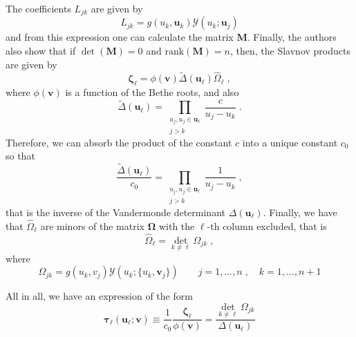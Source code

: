 \documentclass[a4paper,11pt]{amsart}
\begin{document}
The coefficients \(L_{jk}\) are given by 
\begin{equation}
  L_{jk} = g(u_k, \bm{u}_k) \mathcal{Y}(u_k; \bm{u}_j)
\end{equation}
and from this expression one can calculate the matrix \(\bm{M}\).
Finally, the authors also show that if \(\det (\bm{M}) = 0 \) and
\(\mathrm{rank}(\bm{M}) = n\), then, the Slavnov products are given by
\begin{equation}
 \bm{\zeta}_\ell = \phi(\bm{v}) \tilde{\Delta}(\bm{u}_\ell)\hat{\Omega}_\ell\; ,
\end{equation}
where \(\phi(\bm{v})\) is a function of the Bethe roots, and also
\begin{equation}
  \tilde{\Delta}(\bm{u}_\ell) = \prod_{\substack{u_j, u_j \in \bm{u}_\ell \\ j>k}} \frac{c}{u_j - u_k}\; . 
\end{equation}
Therefore, we can absorb the product of the constant \(c\) into
a unique constant \(c_0\) so that 
\begin{equation}
  \frac{\tilde{\Delta}(\bm{u}_\ell)}{c_0} = \prod_{\substack{u_j, u_j \in \bm{u}_\ell \\ j>k}} \frac{1}{u_j - u_k}\; , 
\end{equation}
that is the inverse of the Vandermonde determinant
\(\Delta(\bm{u}_\ell)\).
Finally, we have  that \(\hat{\Omega}_\ell\) are minors of the matrix \(\bm{\Omega}\) with the \(\ell\)-th
column excluded, that is 
\begin{equation}
 \hat{\Omega}_\ell = \det_{k\neq \ell} \Omega_{jk}\; ,
\end{equation}
where
\begin{equation}
  \Omega_{jk} = g(u_k, v_j) \mathcal{Y}(u_k; \{u_k, \bm{v}_j\})
  \qquad j= 1, \dots, n\; , \quad k =1, \dots, n+1
\end{equation}

All in all, we have an expression of the
form
\begin{equation}
  \bm{\tau}_\ell(\bm{u}_\ell; \bm{v}) \equiv \frac{1}{c_0}\frac{\bm{\zeta}_\ell}{\phi(\bm{v})}
  = \frac{\det_{k\neq \ell} \Omega_{jk}}{\Delta(\bm{u}_\ell)}
\end{equation}
\end{document}

